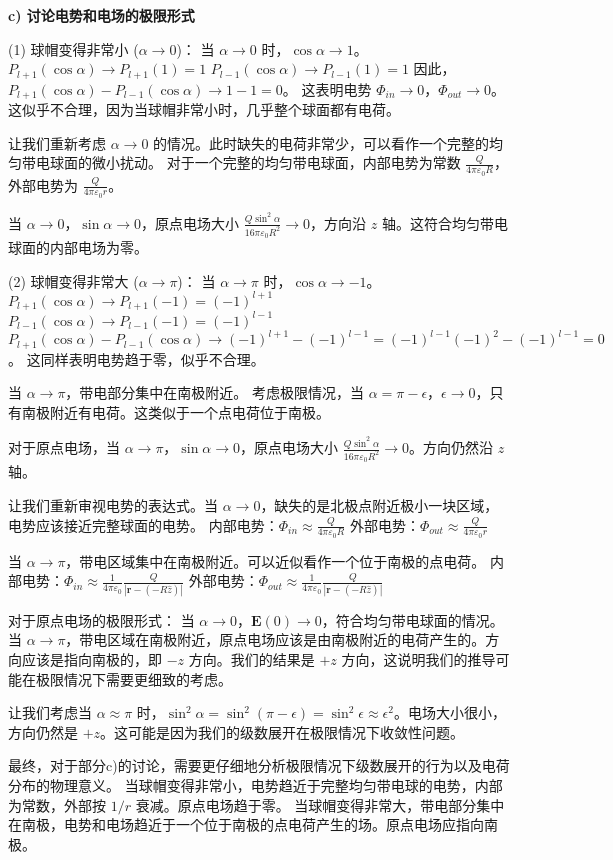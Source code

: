 \textbf{c) 讨论电势和电场的极限形式}

(1) 球帽变得非常小 ($\alpha \rightarrow 0$)：
当 $\alpha \rightarrow 0$ 时，$\cos\alpha \rightarrow 1$。
$P_{l+1}(\cos\alpha) \rightarrow P_{l+1}(1) = 1$
$P_{l-1}(\cos\alpha) \rightarrow P_{l-1}(1) = 1$
因此，$P_{l+1}(\cos\alpha) - P_{l-1}(\cos\alpha) \rightarrow 1 - 1 = 0$。
这表明电势 $\Phi_{in} \rightarrow 0$，$\Phi_{out} \rightarrow 0$。这似乎不合理，因为当球帽非常小时，几乎整个球面都有电荷。

让我们重新考虑 $\alpha \rightarrow 0$ 的情况。此时缺失的电荷非常少，可以看作一个完整的均匀带电球面的微小扰动。
对于一个完整的均匀带电球面，内部电势为常数 $\frac{Q}{4\pi \varepsilon_0 R}$，外部电势为 $\frac{Q}{4\pi \varepsilon_0 r}$。

当 $\alpha \rightarrow 0$，$\sin\alpha \rightarrow 0$，原点电场大小 $\frac{Q \sin^2\alpha}{16\pi \varepsilon_0 R^2} \rightarrow 0$，方向沿 $z$ 轴。这符合均匀带电球面的内部电场为零。

(2) 球帽变得非常大 ($\alpha \rightarrow \pi$)：
当 $\alpha \rightarrow \pi$ 时，$\cos\alpha \rightarrow -1$。
$P_{l+1}(\cos\alpha) \rightarrow P_{l+1}(-1) = (-1)^{l+1}$
$P_{l-1}(\cos\alpha) \rightarrow P_{l-1}(-1) = (-1)^{l-1}$
$P_{l+1}(\cos\alpha) - P_{l-1}(\cos\alpha) \rightarrow (-1)^{l+1} - (-1)^{l-1} = (-1)^{l-1} (-1)^2 - (-1)^{l-1} = 0$。
这同样表明电势趋于零，似乎不合理。

当 $\alpha \rightarrow \pi$，带电部分集中在南极附近。
考虑极限情况，当 $\alpha = \pi - \epsilon$，$\epsilon \rightarrow 0$，只有南极附近有电荷。这类似于一个点电荷位于南极。

对于原点电场，当 $\alpha \rightarrow \pi$，$\sin\alpha \rightarrow 0$，原点电场大小 $\frac{Q \sin^2\alpha}{16\pi \varepsilon_0 R^2} \rightarrow 0$。方向仍然沿 $z$ 轴。

让我们重新审视电势的表达式。当 $\alpha \rightarrow 0$，缺失的是北极点附近极小一块区域，电势应该接近完整球面的电势。
内部电势：$\Phi_{in} \approx \frac{Q}{4\pi \varepsilon_0 R}$
外部电势：$\Phi_{out} \approx \frac{Q}{4\pi \varepsilon_0 r}$

当 $\alpha \rightarrow \pi$，带电区域集中在南极附近。可以近似看作一个位于南极的点电荷。
内部电势：$\Phi_{in} \approx \frac{1}{4\pi \varepsilon_0} \frac{Q}{|\mathbf{r} - (-R\hat{z})|}$
外部电势：$\Phi_{out} \approx \frac{1}{4\pi \varepsilon_0} \frac{Q}{|\mathbf{r} - (-R\hat{z})|}$

对于原点电场的极限形式：
当 $\alpha \rightarrow 0$，$\mathbf{E}(0) \rightarrow 0$，符合均匀带电球面的情况。
当 $\alpha \rightarrow \pi$，带电区域在南极附近，原点电场应该是由南极附近的电荷产生的。方向应该是指向南极的，即 $-z$ 方向。我们的结果是 $+z$ 方向，这说明我们的推导可能在极限情况下需要更细致的考虑。

让我们考虑当 $\alpha \approx \pi$ 时，$\sin^2\alpha = \sin^2(\pi - \epsilon) = \sin^2\epsilon \approx \epsilon^2$。电场大小很小，方向仍然是 $+z$。这可能是因为我们的级数展开在极限情况下收敛性问题。

最终，对于部分c)的讨论，需要更仔细地分析极限情况下级数展开的行为以及电荷分布的物理意义。
当球帽变得非常小，电势趋近于完整均匀带电球的电势，内部为常数，外部按 $1/r$ 衰减。原点电场趋于零。
当球帽变得非常大，带电部分集中在南极，电势和电场趋近于一个位于南极的点电荷产生的场。原点电场应指向南极。